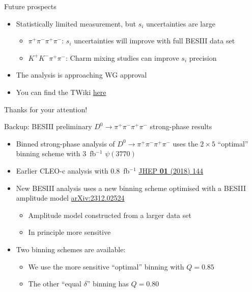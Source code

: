 \documentclass[xcolor={dvipsnames}]{beamer}
\begin{document}
\begin{frame}{Future prospects}
  \vspace{0.6cm}
  \begin{itemize}
    \setlength\itemsep{2.0em}
    \item{Statistically limited measurement, but $s_i$ uncertainties are large}
    \begin{itemize}
      \item{$\pi^+\pi^-\pi^+\pi^-$: $s_i$ uncertainties will improve with full BESIII data set}
      \item{$K^+K^-\pi^+\pi^-$: Charm mixing studies can improve $s_i$ precision}
    \end{itemize}
    \item{The analysis is approaching WG approval}
    \item{You can find the TWiki \href{https://twiki.cern.ch/twiki/bin/viewauth/LHCbPhysics/BPGGSZB2DhD2hhpipiModelIndependent}{here}}
  \end{itemize}
  \vspace{0.5cm}
  \begin{center}
    {\huge Thanks for your attention!}
  \end{center}
\end{frame}

\begin{frame}{Backup: BESIII preliminary $D^0\to\pi^+\pi^-\pi^+\pi^-$ strong-phase results}
  \vspace{0.3cm}
  \begin{itemize}
    \setlength\itemsep{1.0em}
    \item{Binned strong-phase analysis of $D^0\to\pi^+\pi^-\pi^+\pi^-$ uses the $2\times5$ ``optimal'' binning scheme with $3$~fb$^{-1}$ $\psi(3770)$}
    \item{Earlier CLEO-c analysis with $0.8$~fb$^{-1}$ \href{https://link.springer.com/article/10.1007/JHEP01(2018)144}{JHEP \textbf{01} (2018) 144}}
    \item{New BESIII analysis uses a new binning scheme optimised with a BESIII amplitude model \href{https://arxiv.org/abs/2312.02524}{arXiv:2312.02524}}
    \begin{itemize}
      \item{Amplitude model constructed from a larger data set}
      \item{In principle more sensitive}
    \end{itemize}
    \item{Two binning schemes are available:}
    \begin{itemize}
      \item{We use the more sensitive ``optimal'' binning with $Q = 0.85$}
      \item{The other ``equal $\delta$'' binning has $Q = 0.80$}
    \end{itemize}
  \end{itemize}
\end{frame}
\end{document}

